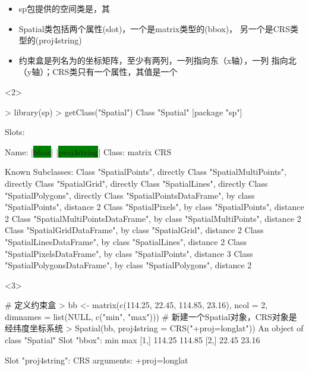 \begin{frame}[t,fragile]{\subsecname}{}
\begin{itemize}
\item<1-> sp包提供的空间类是，其
\item<2-> Spatial类包括两个属性(slot)，一个是matrix类型的(bbox)，
另一个是CRS类型的(proj4string)
\item<3-> 约束盒是列名为的坐标矩阵，至少有两列，一列指向东（x轴），一列
指向北（y轴）；CRS类只有一个属性，其值是一个
\end{itemize}

\begin{overlayarea}{\textwidth}{\textheight}
\begin{onlyenv}<2>
\begin{rcode}
> library(sp)
> getClass("Spatial")
Class "Spatial" [package "sp"]

Slots:
                              
Name:         |\colorbox{green}{bbox}| |\colorbox{green}{proj4string}|
Class:      matrix         CRS

Known Subclasses: 
Class "SpatialPoints", directly
Class "SpatialMultiPoints", directly
Class "SpatialGrid", directly
Class "SpatialLines", directly
Class "SpatialPolygons", directly
Class "SpatialPointsDataFrame", by class "SpatialPoints", distance 2
Class "SpatialPixels", by class "SpatialPoints", distance 2
Class "SpatialMultiPointsDataFrame", by class "SpatialMultiPoints", distance 2
Class "SpatialGridDataFrame", by class "SpatialGrid", distance 2
Class "SpatialLinesDataFrame", by class "SpatialLines", distance 2
Class "SpatialPixelsDataFrame", by class "SpatialPoints", distance 3
Class "SpatialPolygonsDataFrame", by class "SpatialPolygons", distance 2
\end{rcode}
\end{onlyenv}

\begin{onlyenv}<3>
\begin{rcode}
# 定义约束盒
> bb <- matrix(c(114.25, 22.45, 114.85, 23.16), ncol = 2, dimnames = list(NULL, c("min", "max")))
# 新建一个Spatial对象，CRS对象是经纬度坐标系统
> Spatial(bb, proj4string = CRS("+proj=longlat"))
An object of class "Spatial"
Slot "bbox":
        min    max
[1,] 114.25 114.85
[2,]  22.45  23.16

Slot "proj4string":
CRS arguments: +proj=longlat
\end{rcode}
\end{onlyenv}
\end{overlayarea}
\end{frame}


